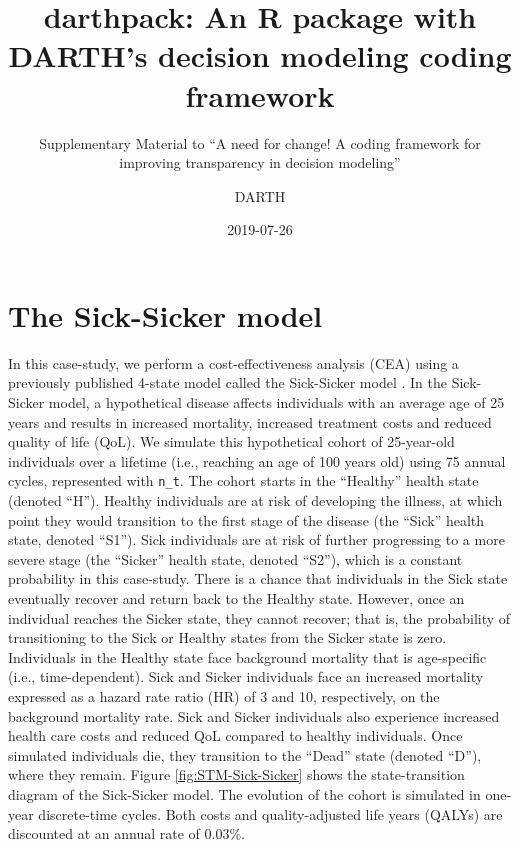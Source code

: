 \documentclass[]{book}
\title{darthpack: An R package with DARTH's decision modeling coding framework}
\subtitle{Supplementary Material to ``A need for change! A coding framework for
improving transparency in decision modeling''}
\author{DARTH}
\date{2019-07-26}
\begin{document}
\maketitle

{
\setcounter{tocdepth}{1}
\tableofcontents
}
\chapter*{The Sick-Sicker model}\label{the-sick-sicker-model}

In this case-study, we perform a cost-effectiveness analysis (CEA) using
a previously published 4-state model called the Sick-Sicker model
\citep{Enns2015}. In the Sick-Sicker model, a hypothetical disease
affects individuals with an average age of 25 years and results in
increased mortality, increased treatment costs and reduced quality of
life (QoL). We simulate this hypothetical cohort of 25-year-old
individuals over a lifetime (i.e., reaching an age of 100 years old)
using 75 annual cycles, represented with \texttt{n\_t}. The cohort
starts in the ``Healthy'' health state (denoted ``H''). Healthy
individuals are at risk of developing the illness, at which point they
would transition to the first stage of the disease (the ``Sick'' health
state, denoted ``S1''). Sick individuals are at risk of further
progressing to a more severe stage (the ``Sicker'' health state, denoted
``S2''), which is a constant probability in this case-study. There is a
chance that individuals in the Sick state eventually recover and return
back to the Healthy state. However, once an individual reaches the
Sicker state, they cannot recover; that is, the probability of
transitioning to the Sick or Healthy states from the Sicker state is
zero. Individuals in the Healthy state face background mortality that is
age-specific (i.e., time-dependent). Sick and Sicker individuals face an
increased mortality expressed as a hazard rate ratio (HR) of 3 and 10,
respectively, on the background mortality rate. Sick and Sicker
individuals also experience increased health care costs and reduced QoL
compared to healthy individuals. Once simulated individuals die, they
transition to the ``Dead'' state (denoted ``D''), where they remain.
Figure \ref{fig:STM-Sick-Sicker} shows the state-transition diagram of
the Sick-Sicker model. The evolution of the cohort is simulated in
one-year discrete-time cycles. Both costs and quality-adjusted life
years (QALYs) are discounted at an annual rate of 0.03\%.
\end{document}
